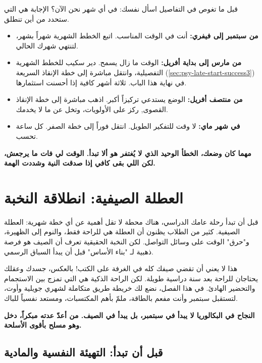 \documentclass[12pt,a4paper]{book}
\newcommand{\importantAr}[1]{%
	\begin{important}
		\bfseries #1
	\end{important}
}
\begin{document}
	قبل ما تغوص في التفاصيل اسأل نفسك: في أي شهر نحن الآن؟ الإجابة هي التي ستحدد من أين تنطلق.
	
	\begin{itemize}
		\item \textbf{من سبتمبر إلى فيفري:} أنت في الوقت المناسب. اتبع الخطط الشهرية شهراً بشهر، لتنتهي شهرك الحالي.
		
		\item \textbf{من مارس إلى بداية أفريل:}
الوقت ما زال يسمح. دير سكيب للخطط الشهرية التفصيلية، وانتقل مباشرة إلى خطة الإنقاذ السريعة (\ref{sec:psy-late-start-success3}) في نهاية هذا الباب. ثلاثة أشهر كافية إذا أحسنت استثمارها.
		
		\item \textbf{من منتصف أفريل:}
		الوضع يستدعي تركيزاً أكبر. اذهب مباشرة إلى خطة الإنقاذ القصوى, ركز على الأولويات، وتخل عن ما لا يخدمك.
		
		\item \textbf{في شهر ماي:}
		لا وقت للتفكير الطويل. انتقل فوراً إلى خطة الصفر. كل ساعة تحسب.
	\end{itemize}
	
	\importantAr{مهما كان وضعك، الخطأ الوحيد الذي لا يُغتفر هو ألا تبدأ. الوقت لي فات ما يرجعش، لكن اللي بقى كافي إذا صدقت النية وشددت الهمة.}
	
	\section{العطلة الصيفية: انطلاقة النخبة}
	
	قبل أن تبدأ رحلة عامك الدراسي، هناك محطة لا تقل أهمية عن أي خطة شهرية: العطلة الصيفية. كثير من الطلاب يظنون أن العطلة هي للراحة فقط، والنوم إلى الظهيرة، و"حرق" الوقت على وسائل التواصل. لكن النخبة الحقيقية تعرف أن الصيف هو فرصة ذهبية لـ "بناء الأساس" قبل أن يبدأ السباق الرسمي.
	
	هذا لا يعني أن تقضي صيفك كله في الغرفة على الكتب! بالعكس، جسدك وعقلك يحتاجان للراحة بعد سنة دراسية طويلة. لكن الراحة الذكية هي التي تمزج بين الاستجمام والتحضير الهادئ. في هذا الفصل، نضع لك خريطة طريق متكاملة لشهري جويلية وأوت، لتستقبل سبتمبر وأنت مفعم بالطاقة، ملمّ بأهم المكتسبات، ومستعد نفسياً للباك.
	
	\importantAr{النجاح في البكالوريا لا يبدأ في سبتمبر، بل يبدأ في الصيف. من أعدّ عدته مبكراً، دخل وهو مسلح بأقوى الأسلحة.}
	
	\subsection{قبل أن تبدأ: التهيئة النفسية والمادية}
	
\end{document}
